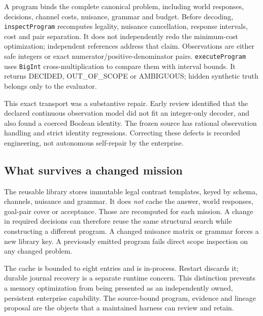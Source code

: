 \documentclass[11pt,letterpaper]{article}
\theoremstyle{definition}\newtheorem{definition}[theorem]{Definition}
\theoremstyle{remark}\newtheorem{remark}[theorem]{Remark}
\newcommand{\status}[1]{\textsf{\small #1}}
\begin{document}
A program binds the complete canonical problem, including world responses, decisions, channel costs, nuisance, grammar and budget. Before decoding, \texttt{inspectProgram} recomputes legality, nuisance cancellation, response intervals, cost and pair separation. It does not independently redo the minimum-cost optimization; independent references address that claim. Observations are either safe integers or exact numerator/positive-denominator pairs. \texttt{executeProgram} uses \texttt{BigInt} cross-multiplication to compare them with interval bounds. It returns \status{DECIDED}, \status{OUT\_OF\_SCOPE} or \status{AMBIGUOUS}; hidden synthetic truth belongs only to the evaluator.

This exact transport was a substantive repair. Early review identified that the declared continuous observation model did not fit an integer-only decoder, and also found a coerced Boolean identity. The frozen source has rational observation handling and strict identity regressions. Correcting these defects is recorded engineering, not autonomous self-repair by the enterprise.

\subsection{What survives a changed mission}
The reusable library stores immutable legal contrast templates, keyed by schema, channels, nuisance and grammar. It does \emph{not} cache the answer, world responses, goal-pair cover or acceptance. Those are recomputed for each mission. A change in required decisions can therefore reuse the same structural search while constructing a different program. A changed nuisance matrix or grammar forces a new library key. A previously emitted program fails direct scope inspection on any changed problem.

The cache is bounded to eight entries and is in-process. Restart discards it; durable journal recovery is a separate runtime concern. This distinction prevents a memory optimization from being presented as an independently owned, persistent enterprise capability. The source-bound program, evidence and lineage proposal are the objects that a maintained harness can review and retain.
\end{document}
